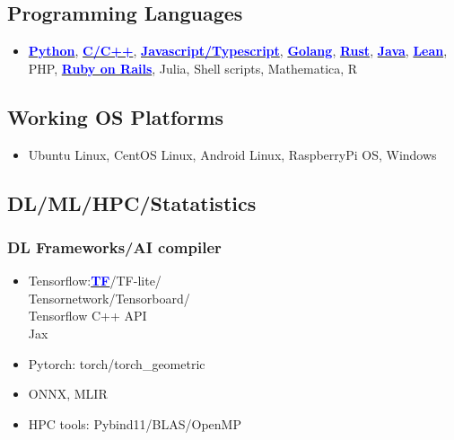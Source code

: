 \begin{skillbox}
\subsection*{Programming Languages}
\begin{itemize}[noitemsep]
    \item \href{https://github.com/Kuo-TingKai/submarine-cable-monitor}{\textbf{\textcolor{blue}{Python}}}, 
    \href{https://github.com/Kuo-TingKai/cpp_linux_chat}{\textbf{\textcolor{blue}{C/C++}}}, 
    \href{https://github.com/Kuo-TingKai/three-3d-game}{\textbf{\textcolor{blue}{Javascript/Typescript}}}, 
    \href{https://github.com/Kuo-TingKai/golang-web3-app}{\textbf{\textcolor{blue}{Golang}}},
    \href{https://github.com/xiph/rav1e/compare/master...Kuo-TingKai:rav1e:master}{\textbf{\textcolor{blue}{Rust}}},
    \href{https://github.com/Kuo-TingKai/java-backend-cloud-maven-app}{\textbf{\textcolor{blue}{Java}}}, 
    \href{https://github.com/Kuo-TingKai/lean4-basic-ag}{\textbf{\textcolor{blue}{Lean}}}, PHP, 
    \href{https://github.com/Kuo-TingKai/RoR-app}{\textbf{\textcolor{blue}{Ruby on Rails}}}, 
    Julia, Shell scripts, Mathematica, R
\end{itemize}

\subsection*{Working OS Platforms}
\begin{itemize}[noitemsep]
    \item Ubuntu Linux, CentOS Linux, Android Linux, RaspberryPi OS, Windows
\end{itemize}

\subsection*{DL/ML/HPC/Statatistics}

\subsubsection*{DL Frameworks/AI compiler}
\begin{itemize}[noitemsep]
    \item Tensorflow:\href{https://github.com/Kuo-TingKai/TNNN}{\textbf{\textcolor{blue}{TF}}}/TF-lite/\\Tensornetwork/Tensorboard/\\Tensorflow C++ API\\
    Jax
    \item Pytorch: torch/torch\_geometric
    \item ONNX, MLIR
    \item HPC tools: Pybind11/BLAS/OpenMP 
\end{itemize}

\end{skillbox}
